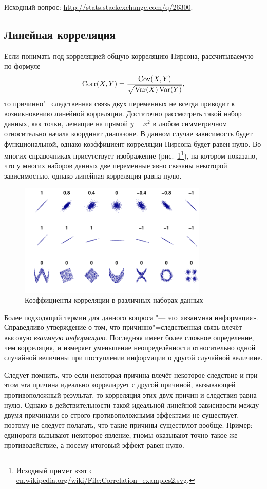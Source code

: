 \documentclass[final,pdftex]{../../template/epsilonj}
\begin{document}
Исходный вопрос: \url{http://stats.stackexchange.com/q/26300}.

\subsection{Линейная корреляция}

Если понимать под корреляцией общую корреляцию Пирсона, рассчитываемую по формуле
\[
\operatorname{Corr}(X,Y) = \frac{\operatorname{Cov}(X,Y)}{\sqrt{\operatorname{Var}(X) \operatorname{Var}(Y)}},
\]
то причинно"=следственная связь двух переменных не всегда приводит к возникновению линейной корреляции. Достаточно рассмотреть такой набор данных, как точки, лежащие на прямой $y = x^2$ в любом симметричном относительно начала координат диапазоне. В данном случае зависимость будет функциональной, однако коэффициент корреляции Пирсона будет равен нулю. Во многих справочниках присутствует изображение (рис.~\ref{fig:corr}\footnote{Исходный примет взят с \url{en.wikipedia.org/wiki/File:Correlation_examples2.svg}.}), на котором показано, что у многих наборов данных две переменные явно связаны некоторой зависимостью, однако линейная корреляция равна нулю.

\begin{figure}[htbp]
	\centering
	\includegraphics[width=9cm]{corr-image.pdf}
	\caption{Коэффициенты корреляции в различных наборах данных} \label{fig:corr}
\end{figure}

Более подходящий термин для данного вопроса "--- это «взаимная информация». Справедливо утверждение о том, что причинно"=следственная связь влечёт высокую \textit{взаимную информацию}. Последняя имеет более сложное определение, чем корреляция, и измеряет уменьшение неопределённости относительно одной случайной величины при поступлении информации о другой случайной величине.

Следует помнить, что если некоторая причина влечёт некоторое следствие и при этом эта причина идеально коррелирует с другой причиной, вызывающей противоположный результат, то корреляция этих двух причин и следствия равна нулю. Однако в действительности такой идеальной линейной зависивости между двумя причинами со строго противоположными эффектами не существует, поэтому не следует полагать, что такие причины существуют вообще. Пример: единороги вызывают некоторое явление, гномы оказывают точно такое же противодействие, а посему итоговый эффект равен нулю.
\end{document}
